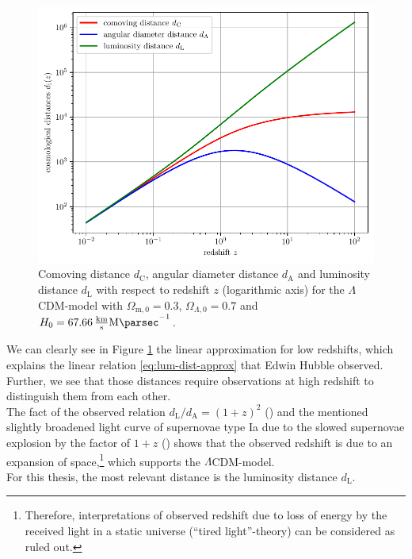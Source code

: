 \begin{figure}[H]
    \centering
    \includegraphics[scale=0.9]{figures/plots/PDF/redshift-vs-cosmological-distances.pdf}
    \caption{Comoving distance $d_{\text{C}}$, angular diameter distance $d_{\text{A}}$ and luminosity distance $d_{\text{L}}$ with respect to redshift $z$ (logarithmic axis) for the $\Lambda$CDM-model with $\Omega_{\text{m},0} = 0.3$, $\Omega_{\Lambda,0} = 0.7$ and $H_{0} = \SI{67.66}{\frac{\kilo \meter}{\second} \mega \parsec^{-1}}$.}
    \label{fig:redshift-vs-cosmological-distances}
\end{figure}

\noindent We can clearly see in Figure \ref{fig:redshift-vs-cosmological-distances} the linear approximation for low redshifts, which explains the linear relation \eqref{eq:lum-dist-approx} that Edwin Hubble observed. Further, we see that those distances require observations at high redshift to distinguish them from each other. \\
The fact of the observed relation $\displaystyle d_{\text{L}}/d_{\text{A}} = (1 + z)^2$ (\cite[p.~58]{Weinberg2008}) and the mentioned slightly broadened light curve of supernovae type Ia due to the slowed supernovae explosion by the factor of $1 + z$ (\cite[p.~10/11]{Goldhaber2001}) shows that the observed redshift is due to an expansion of space,\footnote{Therefore, interpretations of observed redshift due to loss of energy by the received light in a static universe (``tired light''-theory) can be considered as ruled out.} which supports the $\Lambda$CDM-model. \\
\noindent For this thesis, the most relevant distance is the luminosity distance $d_{\text{L}}$.
